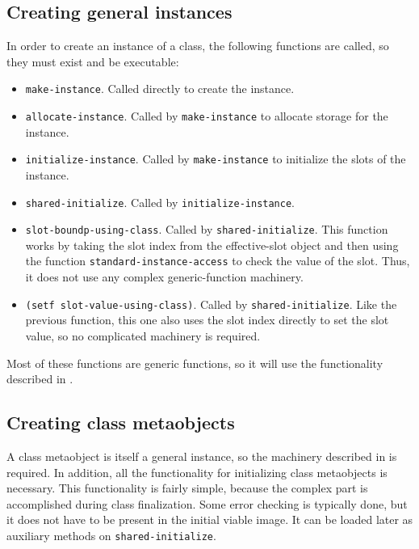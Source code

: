\subsection{Creating general instances}
\label{sec-bootstrapping-creating-general-instances}

In order to create an instance of a class, the following functions
are called, so they must exist and be executable:

\begin{itemize}
\item \texttt{make-instance}.  Called directly to create the instance.
\item \texttt{allocate-instance}.  Called by \texttt{make-instance} to
  allocate storage for the instance.
\item \texttt{initialize-instance}.  Called by \texttt{make-instance}
  to initialize the slots of the instance.
\item \texttt{shared-initialize}.  Called by
  \texttt{initialize-instance}.
\item \texttt{slot-boundp-using-class}.  Called by
  \texttt{shared-initialize}.  This function works by taking the slot
  index from the effective-slot object and then using the function
  \texttt{standard-instance-access} to check the value of the slot.
  Thus, it does not use any complex generic-function machinery.
\item \texttt{(setf slot-value-using-class)}.  Called by
  \texttt{shared-initialize}.  Like the previous function, this one
  also uses the slot index directly to set the slot value, so no
  complicated machinery is required.
\end{itemize}

Most of these functions are generic functions, so it will use the
functionality described in
.


\subsection{Creating class metaobjects}

A class metaobject is itself a general instance, so the machinery
described in  is
required.  In addition, all the functionality for initializing class
metaobjects is necessary.  This functionality is fairly simple,
because the complex part is accomplished during class finalization.
Some error checking is typically done, but it does not have to be
present in the initial viable image.  It can be loaded later as
auxiliary methods on \texttt{shared-initialize}.

